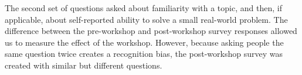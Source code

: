 \documentclass[10pt, twocolumn]{article}
\begin{document}

The second set of questions asked about familiarity with a topic,
and then,
if applicable,
about self-reported ability to solve a small real-world problem.
The difference between the pre-workshop and post-workshop survey responses allowed us to measure the effect of the workshop.
However,
because asking people the same question twice creates a recognition bias,
the post-workshop survey was created with similar but different questions.
\end{document}
